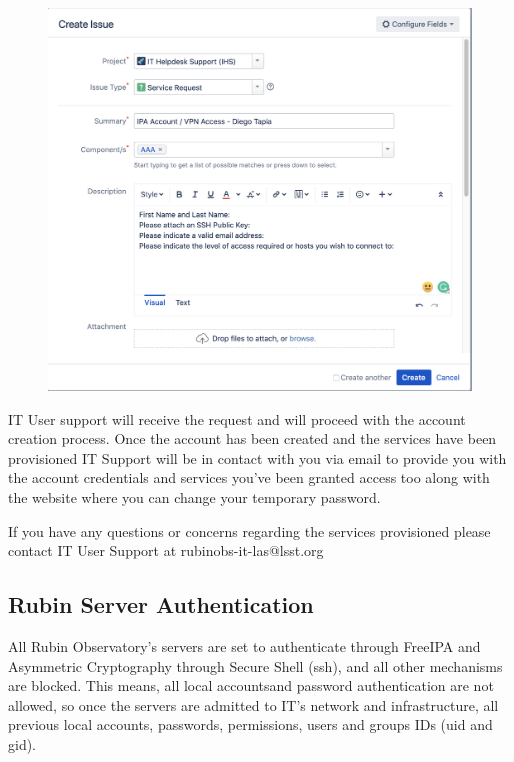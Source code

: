 \begin{figure}
  \includegraphics[width=13cm]{Images/example3.png}
\end{figure}

\vspace{10 mm}
IT User support will receive the request and will proceed with the account creation process. Once the account has been created and the services have been provisioned IT Support will be in contact with you via email to provide you with the account credentials and services you've been granted access too along with the website where you can change your temporary password.

If you have any questions or concerns regarding the services provisioned please contact IT User Support at rubinobs-it-las@lsst.org


\subsection{Rubin Server Authentication}
\label{sec:SSH}

All  Rubin  Observatory’s  servers  are  set  to  authenticate  through  FreeIPA  and  Asymmetric Cryptography through  Secure  Shell  (ssh),  and all other  mechanisms  are  blocked.  This  means,  all  local accountsand password authentication are not allowed, so once the servers are admitted to IT’s network and infrastructure, all previous local accounts, passwords, permissions, users and groups IDs (uid and gid).


